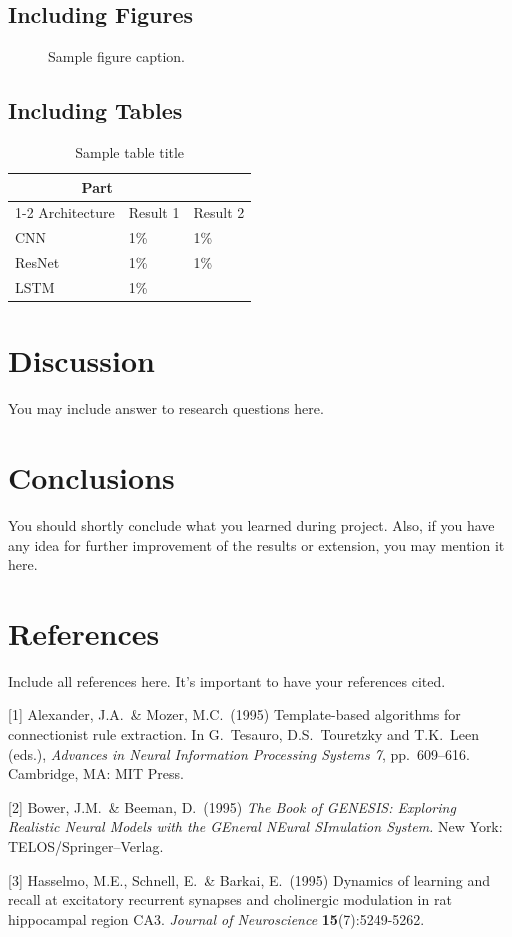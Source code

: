 \documentclass{article}
\begin{document}
\subsection{Including Figures}


\begin{figure}
  \centering
  \fbox{\rule[-.5cm]{0cm}{4cm} \rule[-.5cm]{4cm}{0cm}}
  \caption{Sample figure caption.}
\end{figure}



\subsection{Including Tables}

\begin{table}
  \caption{Sample table title}
  \label{sample-table}
  \centering
  \begin{tabular}{lll}
    \toprule
    \multicolumn{2}{c}{Part}                   \\
    \cmidrule(r){1-2}
    Architecture     & Result 1     & Result 2 \\
    \midrule
    CNN & 1\%  &1\%   \\
    ResNet     &1\% &1\%      \\
    LSTM     &1\%       &   \\
    \bottomrule
  \end{tabular}
\end{table}

\section{Discussion}
You may include answer to research questions here.
	

\section{Conclusions}
You should shortly conclude what you learned during project. Also, if you have any idea for further improvement of the results or extension, you may mention it here.
	
	


\section*{References}
Include all references here. It’s important to have your references cited.
\medskip
{
\small


[1] Alexander, J.A.\ \& Mozer, M.C.\ (1995) Template-based algorithms for
connectionist rule extraction. In G.\ Tesauro, D.S.\ Touretzky and T.K.\ Leen
(eds.), {\it Advances in Neural Information Processing Systems 7},
pp.\ 609--616. Cambridge, MA: MIT Press.


[2] Bower, J.M.\ \& Beeman, D.\ (1995) {\it The Book of GENESIS: Exploring
  Realistic Neural Models with the GEneral NEural SImulation System.}  New York:
TELOS/Springer--Verlag.


[3] Hasselmo, M.E., Schnell, E.\ \& Barkai, E.\ (1995) Dynamics of learning and
recall at excitatory recurrent synapses and cholinergic modulation in rat
hippocampal region CA3. {\it Journal of Neuroscience} {\bf 15}(7):5249-5262.
}
\end{document}
